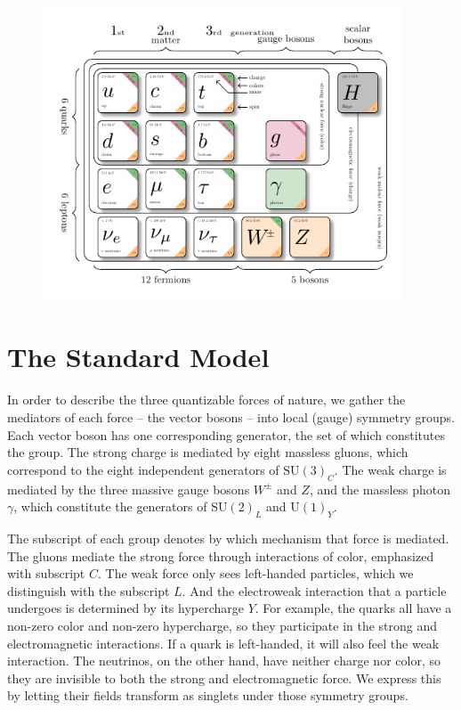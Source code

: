 \begin{figure}[!h]
    \centering
    \includegraphics[width=0.95\textwidth]{figures/SM_figure.pdf}
\end{figure}
\section{The Standard Model}\label{ch:SM}
In order to describe the three quantizable forces of nature, we gather the mediators of each force -- the vector bosons -- into local (gauge) symmetry groups. 
Each vector boson has one corresponding generator, the set of which constitutes the group.
The strong charge is mediated by eight massless gluons, which correspond to the eight independent generators of $\text{SU}(3)_C$. 
The weak charge is mediated by the three massive gauge bosons $W^\pm$ and $Z$, and the massless photon $\gamma$, 
which constitute the generators of $\text{SU}(2)_L$ and $\text{U}(1)_Y$. 

The subscript of each group denotes by which mechanism that force is mediated. The gluons mediate the strong force through interactions of color,
emphasized with subscript $C$. The weak force only sees left-handed particles, 
which we distinguish with the subscript $L$. And the electroweak interaction that a particle undergoes is determined by its hypercharge $Y$. 
For example, the quarks all have a non-zero color and non-zero hypercharge, 
so they participate in the strong and electromagnetic interactions. If a quark is left-handed, it will also feel the weak interaction. 
The neutrinos, on the other hand, have neither charge nor color, 
so they are invisible to both the strong and electromagnetic force. We express this by letting their fields transform as singlets under those symmetry groups.

